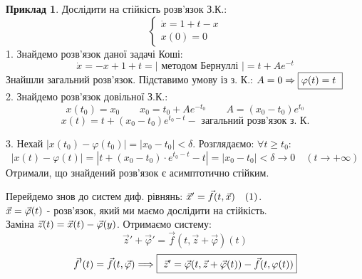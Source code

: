 \documentclass[14pt,a4paper]{scrartcl}
\theoremstyle{definition}
\newtheorem*{example}{Приклад}
\theoremstyle{remark}
\theoremstyle{definition}
\theoremstyle{definition}
\begin{document}
\begin{example}
    Дослідити на стійкість розв'язок З.К.:
    $$
    \begin{cases}
        \dot{x} = 1 + t - x \\
        x(0) = 0
    \end{cases}
    $$
    1. Знайдемо розв'язок даної задачі Коші:
    $$
    \dot{x} = - x + 1 + t = \left| \text{ методом Бернуллі } \right| = t + Ae^{-t}
    $$
    Знайшли загальний розв'язок. Підставимо умову із з. К.: $ A = 0 \Rightarrow \fbox {$\varphi(t) = t$ }$\\
    2. Знайдемо розв'язок довільної З.К.:
    $$
    x(t_0) = x_0 \qquad x_0 = t_0 + Ae^{-t_0} \qquad A = (x_0 - t_0) e^{t_0}
    $$
    $$
    x(t) = t + (x_0 - t_0) e^{t_0 - t} - \text{ загальний розв'язок з. К.}
    $$

    3. Нехай $ \left|  x(t_0) - \varphi(t_0)  \right| = \left| x_0 - t_0 \right|  < \delta $. Розглядаємо: $ \forall t \geq t_0 :$
    $$
    \left| x(t) - \varphi(t) \right| = \left| t + (x_0 - t_0) \cdot e^{ t_0 - t} - t \right| =
     \left| x_0 - t_0 \right|< \delta  \to 0  \quad (t \to + \infty)
    $$
    Отримали, що знайдений розв'язок є асимптотично стійким.
\end{example}
Перейдемо знов до систем диф. рівнянь: $ \vec{x}' = \vec{f} (t, \vec{x})  \quad (1)$.\\
$\vec{x} = \vec{\varphi} (t)$ - розв'язок, який ми маємо дослідити на стійкість.\\
Заміна $ \vec{z} (t) = \vec{x} (t)  - \vec{\varphi} (y) $. Отримаємо систему:
$$ \vec{z}' + \vec{\varphi}'  = \vec{f} (t, \vec{z}+ \vec{\varphi})(t)$$
$$
\vec{f}' (t) = \vec{f} (t, \vec{\varphi})  \Longrightarrow \fbox{ $ \vec{z} ' = \vec{\varphi} (t, \vec{z} + \vec{\varphi} (t)) - \vec{f} ( t, \varphi(t)) $}
$$


\end{document}
